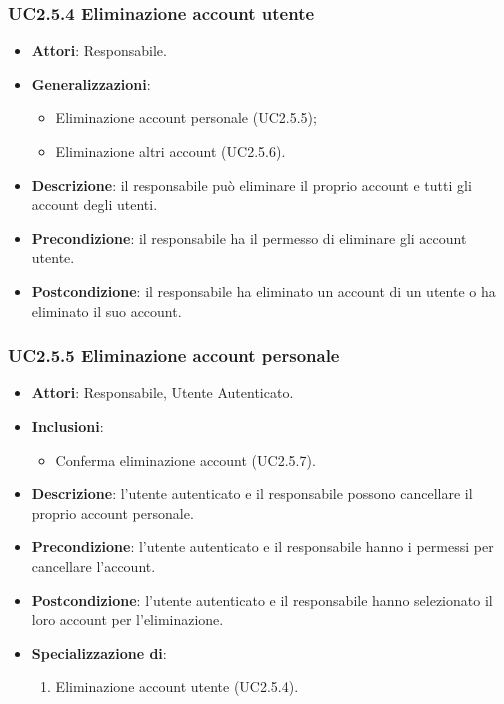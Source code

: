 \subsubsection{UC2.5.4 Eliminazione account utente}
\begin{itemize}
\item \textbf{Attori}: Responsabile.
\item \textbf{Generalizzazioni}:
\begin{itemize}
\item Eliminazione account personale (UC2.5.5);
\item Eliminazione altri account (UC2.5.6).
\end{itemize}
\item \textbf{Descrizione}: il responsabile può eliminare il proprio account e tutti gli account degli utenti.
\item \textbf{Precondizione}: il responsabile ha il permesso di eliminare gli account utente.
\item \textbf{Postcondizione}: il responsabile ha eliminato un account di un utente o ha eliminato il suo account.
\end{itemize}
\subsubsection{UC2.5.5 Eliminazione account personale}
\begin{itemize}
\item \textbf{Attori}: Responsabile, Utente Autenticato.
\item \textbf{Inclusioni}:
\begin{itemize}
\item Conferma eliminazione account (UC2.5.7).
\end{itemize}
\item \textbf{Descrizione}: l'utente autenticato e il responsabile possono cancellare il proprio account personale.
\item \textbf{Precondizione}: l'utente autenticato e il responsabile hanno i permessi per cancellare l'account.
\item \textbf{Postcondizione}: l'utente autenticato e il responsabile hanno selezionato il loro account per l'eliminazione.
\item \textbf{Specializzazione di}:
\begin{enumerate}
\item Eliminazione account utente (UC2.5.4).
\end{enumerate}
\end{itemize}
